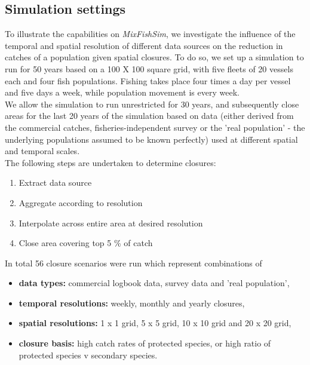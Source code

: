 \documentclass[review]{elsarticle}
\begin{document}
\subsection{Simulation settings}

To illustrate the capabilities on \emph{MixFishSim}, we investigate the
influence of the temporal and spatial resolution of different data sources on
the reduction in catches of a population given spatial closures. To do so, we
set up a simulation to run for 50 years based on a 100 X 100 square grid, with
five fleets of 20 vessels each and four fish populations. Fishing takes place
four times a day per vessel and five days a week, while population movement is
every week. \\

We allow the simulation to run unrestricted for 30 years, and subsequently
close areas for the last 20 years of the simulation based on data (either
derived from the commercial catches, fisheries-independent survey or the 'real
population' - the underlying populations assumed to be known perfectly) used at
different spatial and temporal scales. \\

The following steps are undertaken to determine closures:
\begin{enumerate}
	\item Extract data source
	\item Aggregate according to resolution
	\item Interpolate across entire area at desired resolution
	\item Close area covering top 5 \% of catch 
\end{enumerate}
In total 56 closure scenarios were run which represent combinations of

\begin{itemize}
	\item \textbf{data types:} commercial logbook data, survey data and
		'real population',
	\item \textbf{temporal resolutions:} weekly, monthly and yearly
		closures,
	\item \textbf{spatial resolutions:} 1 x 1 grid, 5 x 5 grid, 10 x 10
		grid and 20 x 20 grid,
	\item \textbf{closure basis:} high catch rates of protected species, or
		high ratio of protected species v secondary species.
\end{itemize}
\end{document}
